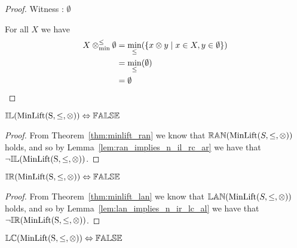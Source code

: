 \begin{proof}

\vspace{0.5em}

Witness : $\emptyset$

\vspace{0.5em}

For all $X$ we have
\begin{align*}
X \mathbin{\otimes_{\min}^{\leq}} \emptyset 	& = \min_\leq(\{ x \otimes y \mid x \in X, y \in \emptyset\}) \\
						& = \min_\leq(\emptyset) \\
						& = \emptyset
\end{align*}
\end{proof}






\begin{theorem} \label{thm:minlift_il}
${\mathbb{IL}}(\mathrm{MinLift(S,\leq,\otimes)}) \Leftrightarrow {\mathbb{FALSE}}$
\end{theorem}

\begin{proof}

\vspace{0.5em}
From Theorem~\ref{thm:minlift_ran} we know that ${\mathbb{RAN}}(\mathrm{MinLift}(S,\leq,\otimes))$ holds, and so by Lemma~\ref{lem:ran_implies_n_il_rc_ar} we have that $\neg {\mathbb{IL}}(\mathrm{MinLift(S,\leq,\otimes)})$.
\end{proof}






\begin{theorem} \label{thm:minlift_ir}
${\mathbb{IR}}(\mathrm{MinLift(S,\leq,\otimes)}) \Leftrightarrow {\mathbb{FALSE}}$
\end{theorem}

\begin{proof}

\vspace{0.5em}
From Theorem~\ref{thm:minlift_lan} we know that ${\mathbb{LAN}}(\mathrm{MinLift}(S,\leq,\otimes))$ holds, and so by Lemma~\ref{lem:lan_implies_n_ir_lc_al} we have that $\neg {\mathbb{IR}}(\mathrm{MinLift(S,\leq,\otimes)})$.
\end{proof}






\begin{theorem} \label{thm:minlift_lc}
${\mathbb{LC}}(\mathrm{MinLift(S,\leq,\otimes)}) \Leftrightarrow {\mathbb{FALSE}}$
\end{theorem}

